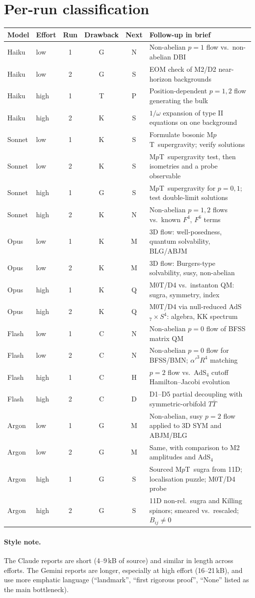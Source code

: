 \documentclass[11pt,a4paper]{article}
\newcommand{\MpT}{M$p$T}
\newcommand{\TTbar}{$T\bar T$}
\begin{document}
\section*{Per-run classification}
\begin{table}[h]
\centering
\small
\begin{tabularx}{\textwidth}{llcccX}
\toprule
Model & Effort & Run & Drawback & Next & Follow-up in brief\\
\midrule
Haiku  & low  & 1 & G & N & Non-abelian $p=1$ flow vs.\ non-abelian DBI\\
Haiku  & low  & 2 & G & S & EOM check of M2/D2 near-horizon backgrounds\\
Haiku  & high & 1 & T & P & Position-dependent $p=1,2$ flow generating the bulk\\
Haiku  & high & 2 & K & S & $1/\omega$ expansion of type II equations on one background\\
Sonnet & low  & 1 & K & S & Formulate bosonic \MpT\ supergravity; verify solutions\\
Sonnet & low  & 2 & K & S & \MpT\ supergravity test, then isometries and a probe observable\\
Sonnet & high & 1 & G & S & \MpT\ supergravity for $p=0,1$; test double-limit solutions\\
Sonnet & high & 2 & K & N & Non-abelian $p=1,2$ flows vs.\ known $F^4$, $F^6$ terms\\
Opus   & low  & 1 & K & M & 3D flow: well-posedness, quantum solvability, BLG/ABJM\\
Opus   & low  & 2 & K & M & 3D flow: Burgers-type solvability, susy, non-abelian\\
Opus   & high & 1 & K & Q & M0T/D4 vs.\ instanton QM: sugra, symmetry, index\\
Opus   & high & 2 & K & Q & M0T/D4 via null-reduced AdS$_7\times S^4$: algebra, KK spectrum\\
Flash  & low  & 1 & C & N & Non-abelian $p=0$ flow of BFSS matrix QM\\
Flash  & low  & 2 & C & N & Non-abelian $p=0$ flow for BFSS/BMN; $\alpha'^3R^4$ matching\\
Flash  & high & 1 & C & H & $p=2$ flow vs.\ AdS$_4$ cutoff Hamilton--Jacobi evolution\\
Flash  & high & 2 & C & D & D1--D5 partial decoupling with symmetric-orbifold \TTbar\\
Argon  & low  & 1 & G & M & Non-abelian, susy $p=2$ flow applied to 3D SYM and ABJM/BLG\\
Argon  & low  & 2 & G & M & Same, with comparison to M2 amplitudes and AdS$_4$\\
Argon  & high & 1 & G & S & Sourced \MpT\ sugra from 11D; localisation puzzle; M0T/D4 probe\\
Argon  & high & 2 & G & S & 11D non-rel.\ sugra and Killing spinors; smeared vs.\ rescaled; $B_{ij}\neq0$\\
\bottomrule
\end{tabularx}
\end{table}

\paragraph{Style note.} The Claude reports are short (4--9\,kB of source) and similar in length across efforts. The Gemini reports are longer, especially at high effort (16--21\,kB), and use more emphatic language (``landmark'', ``first rigorous proof'', ``None'' listed as the main bottleneck).
\end{document}
